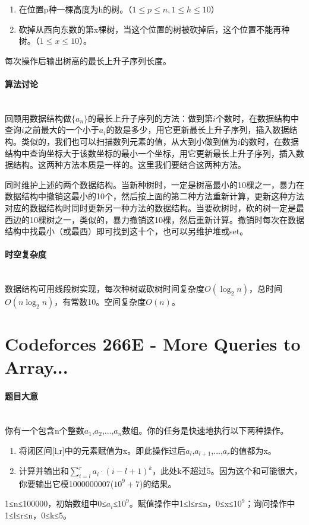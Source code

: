 \documentclass[UTF8]{ctexart}
\newcommand{\myparagraph}[1]{\paragraph{#1}\mbox{}\\}
\theoremstyle{nonumberplain}
\begin{document}
			\begin{enumerate}
				\item 在位置p种一棵高度为h的树。（$1 \leq p \leq n, 1 \leq h \leq 10$）
				\item 砍掉从西向东数的第x棵树，当这个位置的树被砍掉后，这个位置不能再种树。（$1 \leq x \leq 10$）。
			\end{enumerate}
			
			每次操作后输出树高的最长上升子序列长度。
		
		\myparagraph{算法讨论}
		
			回顾用数据结构做$\{a_n\}$的最长上升子序列的方法：做到第$i$个数时，在数据结构中查询$i$之前最大的一个小于$a_i$的数是多少，用它更新最长上升子序列，插入数据结构。类似的，我们也可以扫描数列元素的值，从大到小做到值为$i$的数时，在数据结构中查询坐标大于该数坐标的最小一个坐标，用它更新最长上升子序列，插入数据结构。这两种方法本质是一样的。这里我们要结合这两种方法。
			
			同时维护上述的两个数据结构。当新种树时，一定是树高最小的10棵之一，暴力在数据结构中撤销这最小的10个，然后按上面的第二种方法重新计算，更新这种方法对应的数据结构时同时更新另一种方法的数据结构。当要砍树时，砍的树一定是最西边的10棵树之一，类似的，暴力撤销这10棵，然后重新计算。撤销时每次在数据结构中找最小（或最西）即可找到这十个，也可以另维护堆或set。
		
		\myparagraph{时空复杂度}
		
			数据结构可用线段树实现，每次种树或砍树时间复杂度$O(\log_2n)$，总时间$O(n\log_2n)$，有常数10。空间复杂度$O(n)$。
	
	\section{Codeforces 266E - More Queries to Array...}
	
		\myparagraph{题目大意}
		
			你有一个包含n个整数$a_1$,$a_2$,...,$a_n$数组。你的任务是快速地执行以下两种操作。
			
			\begin{enumerate}[leftmargin=15mm]
				\item 将闭区间{[l,r]}中的元素赋值为x。即此操作过后$a_l$,$a_{l+1}$,...,$a_r$的值都为x。
				\item 计算并输出和$\sum_{i=l}^r a_i \cdot (i-l+1)^k$，此处k不超过5。因为这个和可能很大，你要输出它模1000000007($10^9+7$)的结果。
			\end{enumerate}
			
			1≤n≤100000，初始数组中0≤$a_i$≤$10^9$。赋值操作中1≤l≤r≤n，0≤x≤$10^9$；询问操作中1≤l≤r≤n，0≤k≤5。
			
\end{document}
